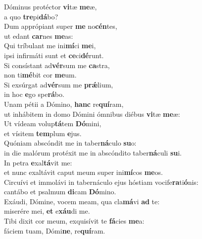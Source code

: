 \evenverse Dóminus protéctor \textbf{vi}tæ \textbf{me}æ,~\*\\
\evenverse a quo \textbf{tre}pi\textbf{dá}bo?\\
\oddverse Dum apprópiant super \textbf{me} no\textbf{cén}tes,~\*\\
\oddverse ut edant \textbf{car}nes \textbf{me}as:\\
\evenverse Qui tríbulant me ini\textbf{mí}ci \textbf{me}i,~\*\\
\evenverse ipsi infirmáti sunt et \textbf{ce}ci\textbf{dé}runt.\\
\oddverse Si consístant ad\textbf{vér}sum me \textbf{ca}stra,~\*\\
\oddverse non ti\textbf{mé}bit cor \textbf{me}um.\\
\evenverse Si exsúrgat ad\textbf{vér}sum me \textbf{prǽ}lium,~\*\\
\evenverse in hoc \textbf{e}go spe\textbf{rá}bo.\\
\oddverse Unam pétii a Dómino, \textbf{hanc} re\textbf{quí}ram,~\*\\
\oddverse ut inhábitem in domo Dómini ómnibus diébus \textbf{vi}tæ \textbf{me}æ:\\
\evenverse Ut vídeam volup\textbf{tá}tem \textbf{Dó}mini,~\*\\
\evenverse et vísitem \textbf{tem}plum \textbf{e}jus.\\
\oddverse Quóniam abscóndit me in taber\textbf{ná}culo \textbf{su}o:~\*\\
\oddverse in die malórum protéxit me in abscóndito taber\textbf{ná}culi \textbf{su}i.\\
\evenverse In petra \textbf{e}xal\textbf{tá}vit me:~\*\\
\evenverse et nunc exaltávit caput meum super ini\textbf{mí}cos \textbf{me}os.\\
\oddverse Circuívi et immolávi in tabernáculo ejus hóstiam vocife\textbf{ra}ti\textbf{ó}nis:~\*\\
\oddverse cantábo et psalmum \textbf{di}cam \textbf{Dó}mino.\\
\evenverse Exáudi, Dómine, vocem meam, qua cla\textbf{má}vi \textbf{ad} te:~\*\\
\evenverse miserére mei, \textbf{et} e\textbf{xáu}di me.\\
\oddverse Tibi dixit cor meum, exquisívit te \textbf{fá}cies \textbf{me}a:~\*\\
\oddverse fáciem tuam, Dómi\textbf{ne}, re\textbf{quí}ram.\\
